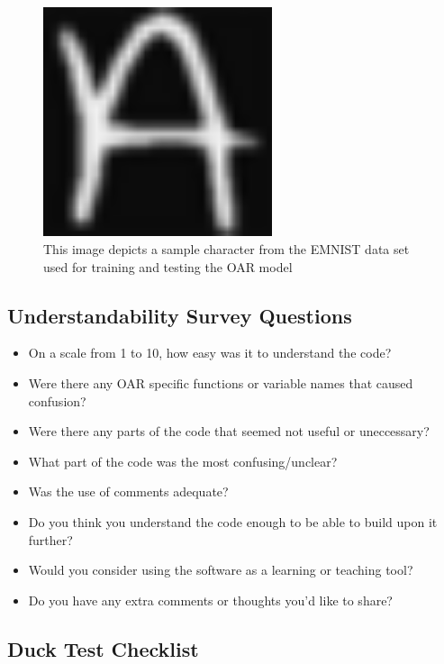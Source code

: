 \documentclass[12pt, titlepage]{article}
\begin{document}
\begin{figure}[h!]
  \begin{center}
    \includegraphics[width=0.6\textwidth]{trainA}
  \caption{This image depicts a sample character from the EMNIST data set used for training and testing the OAR model \citep{EMNIST}}
  \label{Fig_trainA} 
  \end{center}
  \end{figure}
    

\subsection{Understandability Survey Questions} \label{survey_understand}

\begin{itemize}
  \item{On a scale from 1 to 10, how easy was it to understand the code?}
  \item{Were there any OAR specific functions or variable names that caused confusion?}
  \item{Were there any parts of the code that seemed not useful or uneccessary?}
  \item{What part of the code was the most confusing/unclear?}
  \item{Was the use of comments adequate?}
  \item{Do you think you understand the code enough to be able to build upon it further?}
  \item{Would you consider using the software as a learning or teaching tool?}
  \item{Do you have any extra comments or thoughts you'd like to share?}
\end{itemize}

\subsection{Duck Test Checklist} \label{checklist_duckTest}
\end{document}
